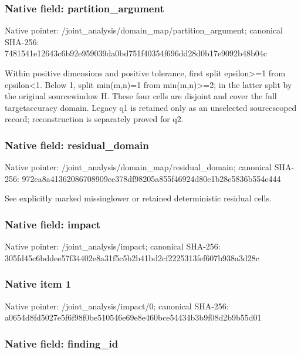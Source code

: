 \documentclass[10pt,a4paper]{article}
\begin{document}
\subsubsection{Native field: partition\_argument}


Native pointer: /joint\_analysis/domain\_m\allowbreak{}ap/partition\_argument; canonical SHA-256: 7481541e12643c6b92e95903\allowbreak{}9da0bd751f40354f696dd28d\allowbreak{}0b17e9092b48b04c


Within positive dimensions and positive tolerance, first split epsilon>=1 from epsilon<1. Below 1, split min(m,n)=1 from min(m,n)>=2; in the latter split by the original sourcewindow H. These four cells are disjoint and cover the full targetaccuracy domain. Legacy q1 is retained only as an unselected sourcescoped record; reconstruction is separately proved for q2.


\subsubsection{Native field: residual\_domain}


Native pointer: /joint\_analysis/domain\_m\allowbreak{}ap/residual\_domain; canonical SHA-256: 972ea8a41362086708909ce3\allowbreak{}78df98205a855f46924d80e1\allowbreak{}b28c5836b554c444


See explicitly marked missinglower or retained deterministic residual cells.


\subsubsection{Native field: impact}


Native pointer: /joint\_analysis/impact; canonical SHA-256: 305fd45c6bddee57f34402e8\allowbreak{}a31f5c5b2b41bd2cf2225313\allowbreak{}fef607b938a3d28c



\subsubsection{Native item 1}


Native pointer: /joint\_analysis/impact/0; canonical SHA-256: a0654d8fd5027e5f6f98f0be\allowbreak{}510546e69e8e460bce54434b\allowbreak{}3b9f08d2b9b55d01



\subsubsection{Native field: finding\_id}
\end{document}
